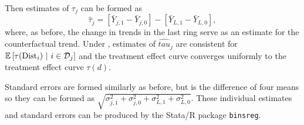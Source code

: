 \documentclass[10pt]{article}
\newcommand{\dist}{\text{Dist}}
\begin{document}
Then estimates of $\tau_j$ can be formed as
\[
    \hat{\tau}_j = \left[\bar{Y}_{j,1} - \bar{Y}_{j,0}\right] - \left[\bar{Y}_{L,1} - \bar{Y}_{L,0}\right],
\]
where, as before, the change in trends in the last ring serve as an estimate for the counterfactual trend. Under , estimates of $\hat{tau}_j$ are consistent for $\condexpec{\tau(\dist_i)}{i \in \mathcal{D}_j}$ and the treatment effect curve converges uniformly to the treatment effect curve $\tau(d)$. 

Standard errors are formed similarly as before, but is the difference of four means so they can be formed as $\sqrt{\sigma_{j,1}^2 + \sigma_{j,0}^2 + \sigma_{L,1}^2 + \sigma_{L,0}^2}$. These individual estimates and standard errors can be produced by the Stata/R package \texttt{binsreg}. 





\newpage~
\end{document}
